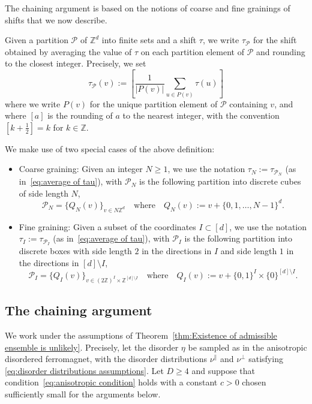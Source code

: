 \documentclass[11pt, reqno]{amsart}
\newcommand{\Z}{\mathbb{Z}}
\numberwithin{equation}{section}
\begin{document}
The chaining argument is based on the notions of coarse and fine grainings of shifts that we now describe. 

Given a partition $\mathcal{P}$ of $\Z^d$ into finite sets and a shift $\tau$, we write $\tau_\mathcal{P}$ for the shift obtained by averaging the value of $\tau$ on each partition element of $\mathcal{P}$ and rounding to the closest integer. Precisely, we set
\begin{equation}\label{eq:average of tau}
\tau_\mathcal{P}(v):=\left[\frac{1}{|P(v)|}\sum_{u\in P(v)}\tau(u)\right]
\end{equation}
where we write $P(v)$ for the unique partition element of $\mathcal{P}$ containing $v$, and where $\left[a\right]$ is the rounding of $a$ to the nearest integer, with the convention $\left[k+\frac{1}{2}\right]=k$ for $k\in\Z$.

We make use of two special cases of the above definition:
\begin{itemize}
\item Coarse graining: Given an integer $N\ge 1$, we use the notation $\tau_N := \tau_{\mathcal{P}_N}$ (as in~\eqref{eq:average of tau}), with $\mathcal{P}_N$ is the following partition into discrete cubes of side length $N$,
\begin{equation*}
\mathcal{P}_N=\{Q_N(v)\}_{v\in N\Z^d}\quad\text{where}\quad Q_N(v):=v+\{0,1,\ldots,N-1\}^d. 
\end{equation*}
\item Fine graining: Given a subset of the coordinates $I\subset[d]$, we use the notation $\tau_I := \tau_{\mathcal{P}_I}$ (as in~\eqref{eq:average of tau}), with $\mathcal{P}_I$ is the following partition into discrete boxes with side length $2$ in the directions in $I$ and side length $1$ in the directions in $[d]\setminus I$,
\begin{equation*}
\mathcal{P}_I=\{Q_I(v)\}_{v\in (2\Z)^I\times \Z^{[d]\setminus I}}\quad\text{where}\quad Q_I(v):=v+\{0,1\}^I\times\{0\}^{[d]\setminus I}. 
\end{equation*}
\end{itemize}

\subsection{The chaining argument}\label{sec:The chaining argument} 
We work under the assumptions of Theorem~\ref{thm:Existence of admissible ensemble is unlikely}. Precisely, let the disorder $\eta$ be sampled as in the anisotropic disordered ferromagnet, with the disorder distributions
$\nu^{\parallel}$ and $\nu^{\perp}$ satisfying \eqref{eq:disorder distributions assumptions}.
Let $D\ge 4$ and suppose that condition~\eqref{eq:anisotropic condition} holds with a constant $c>0$ chosen sufficiently small for the arguments below.
\end{document}

